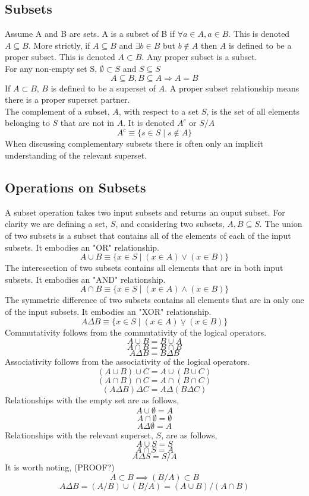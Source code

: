 \documentclass[a4paper]{scrartcl}
\begin{document}
\subsection{Subsets}
Assume A and B are sets. A is a subset of B if $\forall a\in A, a\in B$. This is denoted $A\subseteq B$.
More strictly, if $A\subseteq B$ and $\exists b\in B$ but $b\notin A$ then $A$ is defined to be a proper subset.
This is denoted $A\subset B$. Any proper subset is a subset.\\ 
For any non-empty set S, $\emptyset\subset S$ and $S\subseteq S$\\
$$A\subseteq B, B\subseteq A \Rightarrow A = B$$
If $A \subset B$, $B$ is defined to be a superset of $A$. A proper subset relationship means there is a proper superset partner.\\
The complement of a subset, $A$, with respect to a set $S$, is the set of all elements belonging to $S$ that are not in $A$. It is denoted $A^{c}$ or $S/A$
$$A^{c}\equiv\{s\in S \mid s \notin A \}$$
When discussing complementary subsets there is often only an implicit understanding of the relevant superset.

\subsection{Operations on Subsets}
A subset operation takes two input subsets and returns an ouput subset. For clarity we are defining a set, $S$, and considering two subsets, $A,B \subseteq S$.
The union of two subsets is a subset that contains all of the elements of each of the input subsets. It embodies an "OR" relationship.
$$A\cup B\equiv \{x\in S\mid (x\in A)\vee(x\in B)\}$$ 
The interesection of two subsets contains all elements that are in both input subsets. It embodies an "AND" relationship.
$$A\cap B\equiv \{x\in S\mid (x\in A)\wedge(x\in B)\}$$
 The symmetric difference of two subsets contains all elements that are in only one of the input subsets. It embodies an "XOR" relationship.
$$A\Delta B\equiv \{x\in S\mid (x\in A) \underline{\vee}(x\in B)\}$$
Commutativity follows from the commutativity of the logical operators.
$$A\cup B = B \cup A$$
$$A\cap B = B \cap B$$
$$A\Delta B = B \Delta B$$
Associativity follows from the associativity of the logical operators.
$$(A\cup B)\cup C = A \cup (B\cup C)$$
$$(A\cap B)\cap C = A \cap (B\cap C)$$
$$(A\Delta B)\Delta C = A \Delta (B\Delta C)$$
Relationships with the empty set are as follows,
$$A \cup \emptyset = A$$
$$A \cap \emptyset = \emptyset$$
$$A \Delta \emptyset = A$$
Relationships with the relevant superset, $S$, are as follows,
$$A \cup S = S$$
$$A \cap S = A$$
$$A \Delta S = S/A$$
It is worth noting, (PROOF?)
$$A\subset B \implies (B/A)\subset B$$
$$A\Delta B = (A/B)\cup(B/A) = (A\cup B) / (A\cap B)$$
\end{document}
